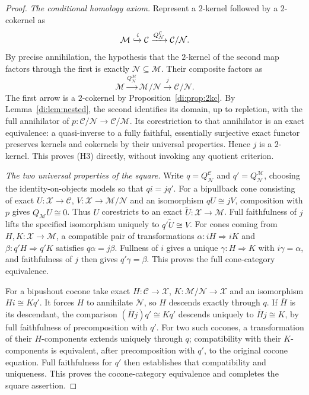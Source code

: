 \documentclass[11pt,reqno,a4paper]{amsart}
\theoremstyle{definition}
\theoremstyle{remark}
\newcommand{\C}{\mathcal{C}}
\newcommand{\M}{\mathcal{M}}
\newcommand{\N}{\mathcal{N}}
\newcommand{\0}{\mathbf{0}}
\renewcommand{\1}{\mathbf{1}}
\newcommand{\X}{\mathcal X}
\begin{document}
\begin{proof}
\smallskip\noindent\emph{The conditional homology axiom.}
Represent a $2$-kernel followed by a $2$-cokernel as
\[
 \M\xhookrightarrow{i}\C\xrightarrow{Q_{\N}^{\C}}\C/\N.
\]
By precise annihilation, the hypothesis that the $2$-kernel of the
second map factors through the first is exactly
$\N\subseteq\M$. Their composite factors as
\[
 \M\xrightarrow{Q_{\N}^{\M}}\M/\N
       \xrightarrow{j}\C/\N.
\]
The first arrow is a $2$-cokernel by Proposition~\ref{di:prop:2kc}.
By Lemma~\ref{di:lem:nested}, the second identifies its domain,
up to repletion, with the full annihilator of
$p:\C/\N\to\C/\M$. Its corestriction to that annihilator is an
exact equivalence: a quasi-inverse to a fully faithful, essentially
surjective exact functor preserves kernels and cokernels by their
universal properties. Hence $j$ is a $2$-kernel. This proves (H3)
directly, without invoking any quotient criterion.

\smallskip\noindent\emph{The two universal properties of the square.}
Write $q=Q_{\N}^{\C}$ and $q'=Q_{\N}^{\M}$, choosing the
identity-on-objects models so that $qi=jq'$. For a bipullback cone
consisting of exact $U:\X\to\C$, $V:\X\to\M/\N$ and an
isomorphism $qU\cong jV$, composition with $p$ gives
$Q_{\M}U\cong0$. Thus $U$ corestricts to an exact
$\widetilde U:\X\to\M$. Full faithfulness of $j$ lifts the
specified isomorphism uniquely to $q'\widetilde U\cong V$.
For cones coming from $H,K:\X\to\M$, a compatible pair of
transformations $\alpha:iH\Rightarrow iK$ and
$\beta:q'H\Rightarrow q'K$ satisfies $q\alpha=j\beta$.
Fullness of $i$ gives a unique $\gamma:H\Rightarrow K$ with
$i\gamma=\alpha$, and faithfulness of $j$ then gives
$q'\gamma=\beta$. This proves the full cone-category equivalence.

For a bipushout cocone take exact $H:\C\to\X$,
$K:\M/\N\to\X$ and an isomorphism $Hi\cong Kq'$.
It forces $H$ to annihilate $\N$, so $H$ descends exactly through
$q$. If $\overline H$ is its descendant, the comparison
$(\overline Hj)q'\cong Kq'$ descends uniquely to
$\overline Hj\cong K$, by full faithfulness of precomposition with
$q'$. For two such cocones, a transformation of their $H$-components
extends uniquely through $q$; compatibility with their
$K$-components is equivalent, after precomposition with $q'$, to
the original cocone equation. Full faithfulness for $q'$ then
establishes that compatibility and uniqueness. This proves the
cocone-category equivalence and completes the square assertion.
\end{proof}
\end{document}
